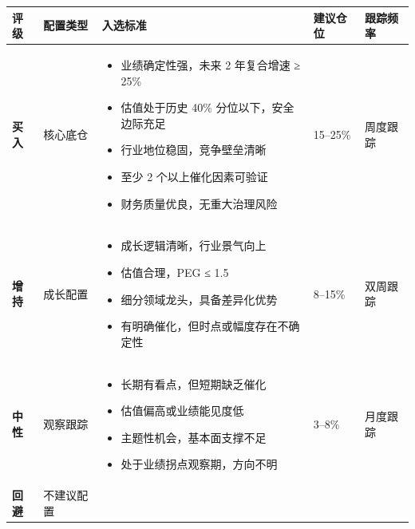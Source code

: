 \begin{exhibitbox}[表 11-1：投资评级体系与配置标准]
\centering
\small
\begin{tabularx}{\textwidth}{X L{1.8cm} L{5.2cm} L{2.0cm} L{2.5cm}}
\toprule
\textbf{评级} & \textbf{配置类型} & \textbf{入选标准} & \textbf{建议仓位} & \textbf{跟踪频率} \\
\midrule
{}
\textbf{买入} & 核心底仓 & \vspace{-0.8em}\begin{itemize}[leftmargin=1.2em, topsep=0pt, partopsep=0pt]
  \item 业绩确定性强，未来 2 年复合增速 ≥ 25\%
  \item 估值处于历史 40\% 分位以下，安全边际充足
  \item 行业地位稳固，竞争壁垒清晰
  \item 至少 2 个以上催化因素可验证
  \item 财务质量优良，无重大治理风险
\end{itemize}\vspace{-0.8em} & 15–25\% & 周度跟踪 \\
\textbf{增持} & 成长配置 & \vspace{-0.8em}\begin{itemize}[leftmargin=1.2em, topsep=0pt, partopsep=0pt]
  \item 成长逻辑清晰，行业景气向上
  \item 估值合理，PEG ≤ 1.5
  \item 细分领域龙头，具备差异化优势
  \item 有明确催化，但时点或幅度存在不确定性
\end{itemize}\vspace{-0.8em} & 8–15\% & 双周跟踪 \\
\textbf{中性} & 观察跟踪 & \vspace{-0.8em}\begin{itemize}[leftmargin=1.2em, topsep=0pt, partopsep=0pt]
  \item 长期有看点，但短期缺乏催化
  \item 估值偏高或业绩能见度低
  \item 主题性机会，基本面支撑不足
  \item 处于业绩拐点观察期，方向不明
\end{itemize}\vspace{-0.8em} & 3–8\% & 月度跟踪 \\
\textbf{回避} & 不建议配置 & \vspace{-0.8em}\begin{itemize}[leftmargin=1.2em, topsep=0pt, partopsep=0pt]

\end{itemize}
\end{tabularx}
\end{exhibitbox}
